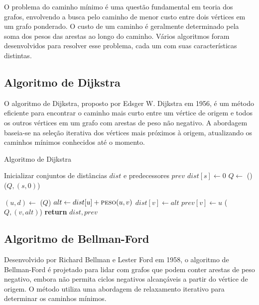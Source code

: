 \documentclass[12pt]{article}
\begin{document}
O problema do caminho mínimo é uma questão fundamental em teoria dos grafos, envolvendo a busca pelo caminho de menor custo entre dois vértices em um grafo ponderado. O custo de um caminho é geralmente determinado pela soma dos pesos das arestas ao longo do caminho. Vários algoritmos foram desenvolvidos para resolver esse problema, cada um com suas características distintas.

\subsection{Algoritmo de Dijkstra}

O algoritmo de Dijkstra, proposto por Edsger W. Dijkstra em 1956, é um método eficiente para encontrar o caminho mais curto entre um vértice de origem e todos os outros vértices em um grafo com arestas de peso não negativo. A abordagem baseia-se na seleção iterativa dos vértices mais próximos à origem, atualizando os caminhos mínimos conhecidos até o momento.

\begin{algorithm}
\caption{Algoritmo de Dijkstra}
\begin{algorithmic}[1]
  \State Inicializar conjuntos de distâncias $dist$ e predecessores $prev$
  \State $dist[s] \gets 0$
  \State $Q \gets$ ()
  \State {}($Q, (s, 0)$)

    \State $(u, d) \gets$ ($Q$)
      \State $alt \gets dist[u] + \textproc{peso}(u, v)$
        \State $dist[v] \gets alt$
        \State $prev[v] \gets u$
        \State {}($Q, (v, alt)$)
      \EndIf
    \EndFor
  \EndWhile
  \State \textbf{return} $dist, prev$
\EndProcedure
\end{algorithmic}
\end{algorithm}

\subsection{Algoritmo de Bellman-Ford}

Desenvolvido por Richard Bellman e Lester Ford em 1958, o algoritmo de Bellman-Ford é projetado para lidar com grafos que podem conter arestas de peso negativo, embora não permita ciclos negativos alcançáveis a partir do vértice de origem. O método utiliza uma abordagem de relaxamento iterativo para determinar os caminhos mínimos.
\end{document}
